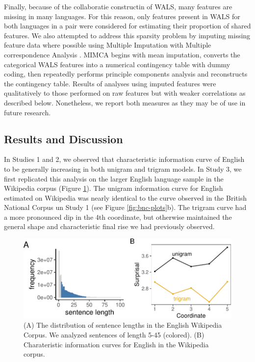 \documentclass[entropy,article,submit,moreauthors,pdftex]{mdpi}
\begin{document}
Finally, because of the collaboratie constructin of WALS, many features
are missing in many languages. For this reason, only features present in
WALS for both languages in a pair were considered for estimating their
proportion of shared features. We also attempted to address this
sparsity problem by imputing missing feature data where possible using
Multiple Imputation with Multiple correspondence Analysis
\citep[MIMCA,][]{audigier2017}. MIMCA begins with mean imputation,
converts the categorical WALS features into a numerical contingency
table with dummy coding, then repeatedly performs principle components
analysis and reconstructs the contingency table. Results of analyses
using imputed features were qualitatively to those performed on raw
features but with weaker correlations as described below. Nonetheless,
we report both measures as they may be of use in future research.

\hypertarget{results-and-discussion-2}{%
\subsection{Results and Discussion}\label{results-and-discussion-2}}

In Studies 1 and 2, we observed that characteristic information curve of
English to be generally increasing in both unigram and trigram models.
In Study 3, we first replicated this analysis on the larger English
language sample in the Wikipedia corpus (Figure \ref{fig:wiki-english}).
The unigram information curve for English estimated on Wikipedia was
nearly identical to the curve observed in the British National Corpus un
Study 1 (see Figure \ref{fig:bnc-plots}b). The trigram curve had a more
pronounced dip in the 4th coordinate, but otherwise maintained the
general shape and characteristic final rise we had previously observed.

\begin{figure}[tb]

{\centering \includegraphics{figs/wiki-english-1} 

}

\caption{(A) The distribution of sentence lengths in the English Wikipedia Corpus. We analyzed sentences of length 5-45 (colored). (B) Charateristic information curves for English in the Wikipedia corpus.}\label{fig:wiki-english}
\end{figure}
\end{document}
